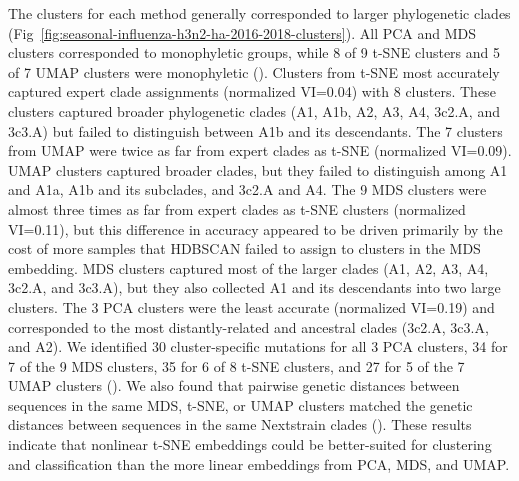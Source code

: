 \documentclass[10pt,letterpaper]{article}
\begin{document}
The clusters for each method generally corresponded to larger phylogenetic clades (Fig~\ref{fig:seasonal-influenza-h3n2-ha-2016-2018-clusters}).
All PCA and MDS clusters corresponded to monophyletic groups, while 8 of 9 t-SNE clusters and 5 of 7 UMAP clusters were monophyletic ().
Clusters from t-SNE most accurately captured expert clade assignments (normalized VI=0.04) with 8 clusters.
These clusters captured broader phylogenetic clades (A1, A1b, A2, A3, A4, 3c2.A, and 3c3.A) but failed to distinguish between A1b and its descendants.
The 7 clusters from UMAP were twice as far from expert clades as t-SNE (normalized VI=0.09).
UMAP clusters captured broader clades, but they failed to distinguish among A1 and A1a, A1b and its subclades, and 3c2.A and A4.
The 9 MDS clusters were almost three times as far from expert clades as t-SNE clusters (normalized VI=0.11), but this difference in accuracy appeared to be driven primarily by the cost of more samples that HDBSCAN failed to assign to clusters in the MDS embedding.
MDS clusters captured most of the larger clades (A1, A2, A3, A4, 3c2.A, and 3c3.A), but they also collected A1 and its descendants into two large clusters.
The 3 PCA clusters were the least accurate (normalized VI=0.19) and corresponded to the most distantly-related and ancestral clades (3c2.A, 3c3.A, and A2).
We identified 30 cluster-specific mutations for all 3 PCA clusters, 34 for 7 of the 9 MDS clusters, 35 for 6 of 8 t-SNE clusters, and 27 for 5 of the 7 UMAP clusters ().
We also found that pairwise genetic distances between sequences in the same MDS, t-SNE, or UMAP clusters matched the genetic distances between sequences in the same Nextstrain clades ().
These results indicate that nonlinear t-SNE embeddings could be better-suited for clustering and classification than the more linear embeddings from PCA, MDS, and UMAP.
\end{document}
